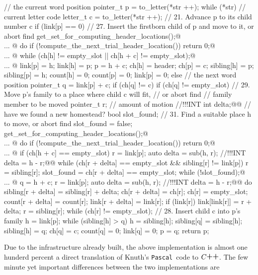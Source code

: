 \documentclass[a4paper,11pt]{article}
\makeatletter
\renewcommand{\=}{\protect\nobreakdash-\hspace{0pt}}
\renewcommand{\~}{\protect\nobreakdash--\hspace{0pt}}
\newcommand{\plusplus}{\textbf{\raisebox{1pt}{++}}}
\newcommand{\cplusplus}{$C\plusplus$}
\newcommand{\pascal}{\code{Pascal}}
\newcommand{\code}[1]{{\tt{#1}}}
\newcommand\code*[1]{\mbox{\code{#1}}}
\let\lst@ifskiplines\iffalse
\newcommand\skipnumbering[1]{%
	\setcounter{lstnumber}{\numexpr#1-1\relax}%
	\let\lst@ifskiplines\iftrue
	\\\lst@PlaceNumber
	\let\lst@ifskiplines\iffalse
	\lst@ifshowskiplines...\fi
}
\let\lst@PlaceNumber\@empty
\makeatother
\begin{document}
\begin{hashtrielisting}[2298]
{	// the current word position
	pointer_t p
		= to_letter(*str ++);
	while (*str) {
		// current letter code
		letter_t c
			= to_letter(*str ++);
		// 21. Advance p to its child number c
		if (link[p] == 0) {
			// 27. Insert the firstborn child of p and move to it, or abort find
			get_set_for_computing_header_locations();@\skipnumbering{2543}@
			do {
				if (!compute_the_next_trial_header_location())
					return 0;@\skipnumbering{2547}@
			} while (ch[h] != empty_slot || ch[h + c] != empty_slot);@\skipnumbering{2549}@
			link[p] = h;
			link[h] = p;
			p = h + c;
			ch[h] = header;
			ch[p] = c;
			sibling[h] = p;
			sibling[p] = h;
			count[h] = 0;
			count[p] = 0;
			link[p] = 0;
		}
		else {
			// the next word position
			pointer_t q
				= link[p] + c;
			if (ch[q] != c) {
				if (ch[q] != empty_slot) {
					// 29. Move p's family to a place where child c will fit,
					//     or abort find
					// family member to be moved
					pointer_t r;
					// amount of motion
					//!!!INT int delta;@\label{cpp-delta-def-int}@
					// have we found a new homestead?
					bool slot_found;
					// 31. Find a suitable place h to move, or abort find
					slot_found = false;
					get_set_for_computing_header_locations();@\skipnumbering{2578}@
					do {
						if (!compute_the_next_trial_header_location())
							return 0;@\skipnumbering{2582}@
						if (ch[h + c] == empty_slot) {
							r = link[p];
							auto delta = sub(h, r); //!!!INT delta = h - r;@\label{cpp-delta-assign-1}@
							while (ch[r + delta] == empty_slot &&
									sibling[r] != link[p])
								r = sibling[r];
							slot_found = ch[r + delta] == empty_slot;
						}
					} while (!slot_found);@\skipnumbering{2592}@
					q = h + c;
					r = link[p];
					auto delta = sub(h, r); //!!!INT delta = h - r;@\label{cpp-delta-assign-2}@
					do {
						sibling[r + delta] = sibling[r] + delta;
						ch[r + delta] = ch[r];
						ch[r] = empty_slot;
						count[r + delta] = count[r];
						link[r + delta] = link[r];
						if (link[r]) link[link[r]] = r + delta;
						r = sibling[r];
					} while (ch[r] != empty_slot);
				}
				// 28. Insert child c into p's family
				h = link[p];
				while (sibling[h] > q)
					h = sibling[h];
				sibling[q] = sibling[h];
				sibling[h] = q;
				ch[q] = c;
				count[q] = 0;
				link[q] = 0;
			}
			p = q;
		}
	}
	return p;
}
\end{hashtrielisting}
%
Due to the infrastructure already built, the above implementation is almost
one hunderd percent a direct translation of Knuth's \pascal\ code to \cplusplus.
The few minute yet important differences between the two implementations are
\end{document}
